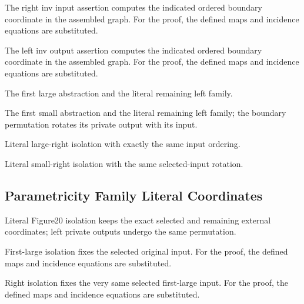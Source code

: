 The right inv input assertion computes the indicated ordered boundary coordinate in the assembled graph.
For the proof, the defined maps and incidence equations are substituted.
\par{}

The left inv output assertion computes the indicated ordered boundary coordinate in the assembled graph.
For the proof, the defined maps and incidence equations are substituted.
\par{}

The first large abstraction and the literal remaining left family.
\par{}

The first small abstraction and the literal remaining left family; the boundary permutation rotates its private output with its input.
\par{}

Literal large-right isolation with exactly the same input ordering.
\par{}

Literal small-right isolation with the same selected-input rotation.
\par{}

\subsection{Parametricity Family Literal Coordinates}
Literal Figure20 isolation keeps the exact selected and remaining external coordinates; left private outputs undergo the same permutation.

First-large isolation fixes the selected original input.
For the proof, the defined maps and incidence equations are substituted.
\par{}

Right isolation fixes the very same selected first-large input.
For the proof, the defined maps and incidence equations are substituted.
\par{}

